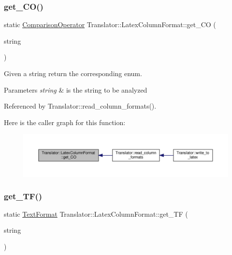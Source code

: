 \subsubsection{\texorpdfstring{get\+\_\+\+C\+O()}{get\_CO()}}
{\footnotesize\ttfamily static \hyperlink{classTranslator_1_1LatexColumnFormat_a9401c4c02f92f224268e919aac9cb15e}{Comparison\+Operator} Translator\+::\+Latex\+Column\+Format\+::get\+\_\+\+CO (\begin{DoxyParamCaption}\item[{const std\+::string \&}]{string }\end{DoxyParamCaption})\hspace{0.3cm}{\ttfamily [static]}}



Given a string return the corresponding enum. 


\begin{DoxyParams}{Parameters}
{\em string} & is the string to be analyzed \\
\hline
\end{DoxyParams}


Referenced by Translator\+::read\+\_\+column\+\_\+formats().

Here is the caller graph for this function\+:
\nopagebreak
\begin{figure}[H]
\begin{center}
\leavevmode
\includegraphics[width=350pt]{d0/d3c/classTranslator_1_1LatexColumnFormat_af10e7ab79455734a336a329306fd3428_icgraph}
\end{center}
\end{figure}
\mbox{\label{classTranslator_1_1LatexColumnFormat_a79cff52c30fc3086aedcff72a10c484a}} 
\subsubsection{\texorpdfstring{get\+\_\+\+T\+F()}{get\_TF()}}
{\footnotesize\ttfamily static \hyperlink{classTranslator_1_1LatexColumnFormat_a3e57341308ef433ca03cb41faa3e6c00}{Text\+Format} Translator\+::\+Latex\+Column\+Format\+::get\+\_\+\+TF (\begin{DoxyParamCaption}\item[{const std\+::string \&}]{string }\end{DoxyParamCaption})\hspace{0.3cm}{\ttfamily [static]}}



